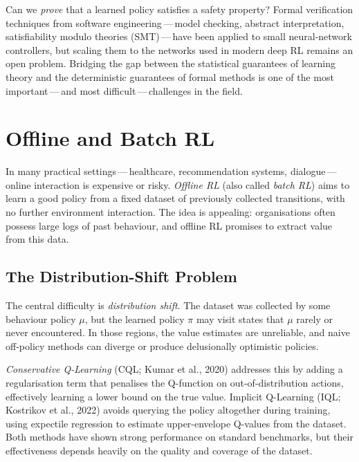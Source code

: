 Can we \emph{prove} that a learned policy satisfies a safety property?
Formal verification techniques from software engineering\,---\,model
checking, abstract interpretation, satisfiability modulo theories
(SMT)\,---\,have been applied to small neural-network controllers, but
scaling them to the networks used in modern deep RL remains an open
problem.  Bridging the gap between the statistical guarantees of
learning theory and the deterministic guarantees of formal methods is
one of the most important\,---\,and most difficult\,---\,challenges in
the field.


\section{Offline and Batch RL}
\label{sec:open-offline}

In many practical settings\,---\,healthcare, recommendation systems,
dialogue\,---\,online interaction is expensive or risky.
\emph{Offline RL} (also called \emph{batch RL}) aims to learn a
good policy from a fixed dataset of previously collected transitions,
with no further environment interaction.  The idea is appealing:
organisations often possess large logs of past behaviour, and offline
RL promises to extract value from this data.

\subsection{The Distribution-Shift Problem}

The central difficulty is \emph{distribution shift}.  The dataset was
collected by some behaviour policy $\mu$, but the learned policy
$\pi$ may visit states that $\mu$ rarely or never encountered.  In
those regions, the value estimates are unreliable, and naive off-policy
methods can diverge or produce delusionally optimistic policies.

\emph{Conservative Q-Learning} (CQL; Kumar et al., 2020) addresses
this by adding a regularisation term that penalises the Q-function on
out-of-distribution actions, effectively learning a lower bound on the
true value.  Implicit Q-Learning (IQL; Kostrikov et al., 2022)
avoids querying the policy altogether during training, using expectile
regression to estimate upper-envelope Q-values from the dataset.
Both methods have shown strong performance on standard benchmarks,
but their effectiveness depends heavily on the quality and coverage
of the dataset.

